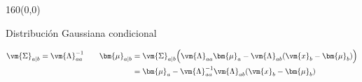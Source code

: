 \documentclass[shownotes,aspectratio=169]{beamer}
\begin{document}
\begin{frame}[plain]
 \begin{textblock}{160}(0,0)
\begin{center}
 \Large Distribuci\'on Gaussiana condicional
\end{center}
\end{textblock}
\vspace{0.75cm}

\begin{align*}
\vm{\Sigma}_{a|b} = \vm{\Lambda}_{aa}^{-1}
 \ \ \ \ \ \ 
 \bm{\mu}_{a|b} & = \vm{\Sigma}_{a|b} \Big( \vm{\Lambda}_{aa} \bm{\mu}_a  - \vm{\Lambda}_{ab}(\vm{x}_b-\bm{\mu}_b)  \Big) \\
 & = \bm{\mu}_a - \vm{\Lambda}_{aa}^{-1} \vm{\Lambda}_{ab}(\vm{x}_b-\bm{\mu}_b)
\end{align*}

\pause
\vspace{1cm}
\Wider[-7cm]{
\begin{mdframed}[backgroundcolor=black!20]
\[p(\vm{x}_a|\vm{x}_b) = \N(\vm{x}| \bm{\mu}_{a|b} , \vm{\Lambda}_{aa}^{-1} ) \]
\end{mdframed}
}


\end{frame}
\end{document}
